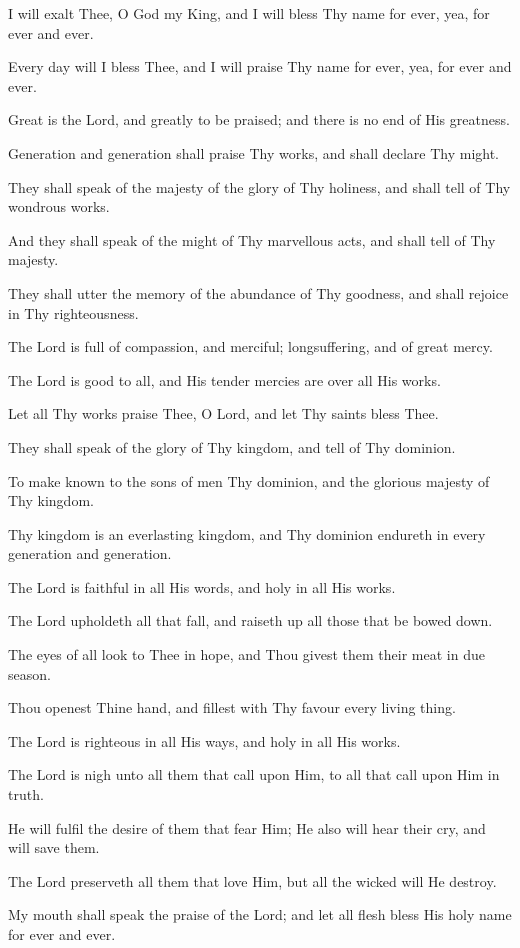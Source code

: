 I will exalt Thee, O God my King, and I will bless Thy name for ever, yea, for ever and ever.

Every day will I bless Thee, and I will praise Thy name for ever, yea, for ever and ever.

Great is the Lord, and greatly to be praised; and there is no end of His greatness.

Generation and generation shall praise Thy works, and shall declare Thy might.

They shall speak of the majesty of the glory of Thy holiness, and shall tell of Thy wondrous works.

And they shall speak of the might of Thy marvellous acts, and shall tell of Thy majesty.

They shall utter the memory of the abundance of Thy goodness, and shall rejoice in Thy righteousness.

The Lord is full of compassion, and merciful; longsuffering, and of great mercy.

The Lord is good to all, and His tender mercies are over all His works.

Let all Thy works praise Thee, O Lord, and let Thy saints bless Thee.

They shall speak of the glory of Thy kingdom, and tell of Thy dominion.

To make known to the sons of men Thy dominion, and the glorious majesty of Thy kingdom.

Thy kingdom is an everlasting kingdom, and Thy dominion endureth in every generation and generation.

The Lord is faithful in all His words, and holy in all His works.

The Lord upholdeth all that fall, and raiseth up all those that be bowed down.
 
The eyes of all look to Thee in hope, and Thou givest them their meat in due season.

Thou openest Thine hand, and fillest with Thy favour every living thing.

The Lord is righteous in all His ways, and holy in all His works.

The Lord is nigh unto all them that call upon Him, to all that call upon Him in truth.

He will fulfil the desire of them that fear Him; He also will hear their cry, and will save them.

The Lord preserveth all them that love Him, but all the wicked will He destroy.

My mouth shall speak the praise of the Lord; and let all flesh bless His holy name for ever and ever.
